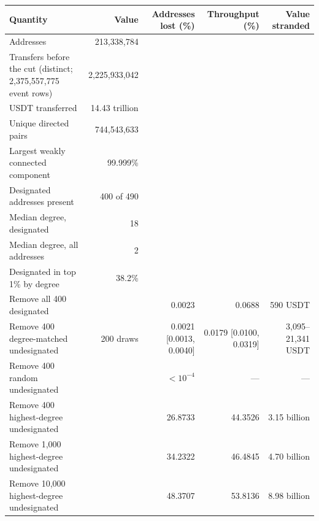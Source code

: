 \begin{tabular}{lrrrr}
\toprule
Quantity & Value & Addresses lost (\%) & Throughput (\%) & Value stranded \\
\midrule
Addresses & 213,338,784 & & & \\
Transfers before the cut (distinct; 2,375,557,775 event rows) & 2,225,933,042 & & & \\
USDT transferred & 14.43 trillion & & & \\
Unique directed pairs & 744,543,633 & & & \\
Largest weakly connected component & 99.999\% & & & \\
Designated addresses present & 400 of 490 & & & \\
Median degree, designated & 18 & & & \\
Median degree, all addresses & 2 & & & \\
Designated in top 1\% by degree & 38.2\% & & & \\
\midrule
Remove all 400 designated & & 0.0023 & 0.0688 & 590 USDT \\
Remove 400 degree-matched undesignated & 200 draws & 0.0021 [0.0013, 0.0040] & 0.0179 [0.0100, 0.0319] & 3,095--21,341 USDT \\
Remove 400 random undesignated & & $<10^{-4}$ & --- & --- \\
Remove 400 highest-degree undesignated & & 26.8733 & 44.3526 & 3.15 billion \\
Remove 1,000 highest-degree undesignated & & 34.2322 & 46.4845 & 4.70 billion \\
Remove 10,000 highest-degree undesignated & & 48.3707 & 53.8136 & 8.98 billion \\
\bottomrule
\end{tabular}
